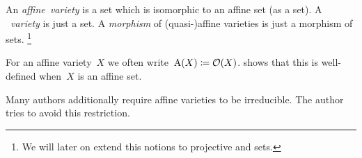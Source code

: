 \begin{definition}
  An \emph{affine~variety} is a {\qaffine} set which is isomorphic to an affine set (as a {\qaffine} set).
  A \emph{{\qaffine}~variety} is just a {\qaffine} set.
  A \emph{morphism} of (quasi-)affine varieties is just a morphism of {\qaffine} sets.%
  \footnote{We will later on extend this notions to projective and {\qprojective} sets.}
\end{definition}


\begin{notation}
  For an affine variety~$X$ we often write~$\operatorname{A}(X) \coloneqq \mathcal{O}(X)$.
   shows that this is well-defined when~$X$ is an affine set.
\end{notation}


\begin{remark}
  Many authors additionally require affine varieties to be irreducible.
  The author tries to avoid this restriction.
\end{remark}


